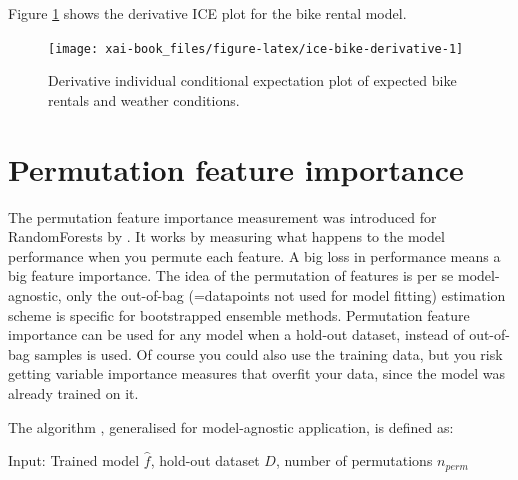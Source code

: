 \documentclass[12pt,]{krantz}
\theoremstyle{definition}
\theoremstyle{definition}
\theoremstyle{definition}
\theoremstyle{remark}
\begin{document}
Figure \ref{fig:ice-bike-derivative} shows the derivative ICE plot for
the bike rental model.

\begin{figure}

{\centering \texttt{[image: xai-book\_files/figure-latex/ice-bike-derivative-1]} 

}

\caption{Derivative individual conditional expectation plot of expected bike rentals and weather conditions.}\label{fig:ice-bike-derivative}
\end{figure}

\section{Permutation feature
importance}\label{permutation-feature-importance}

The permutation feature importance measurement was introduced for
RandomForests by \citet{breiman2001random}. It works by measuring what
happens to the model performance when you permute each feature. A big
loss in performance means a big feature importance. The idea of the
permutation of features is per se model-agnostic, only the out-of-bag
(=datapoints not used for model fitting) estimation scheme is specific
for bootstrapped ensemble methods. Permutation feature importance can be
used for any model when a hold-out dataset, instead of out-of-bag
samples is used. Of course you could also use the training data, but you
risk getting variable importance measures that overfit your data, since
the model was already trained on it.

The algorithm \citep{breiman2001random}, generalised for model-agnostic
application, is defined as:

Input: Trained model \(\hat{f}\), hold-out dataset \(D\), number of
permutations \(n_{perm}\)
\end{document}
